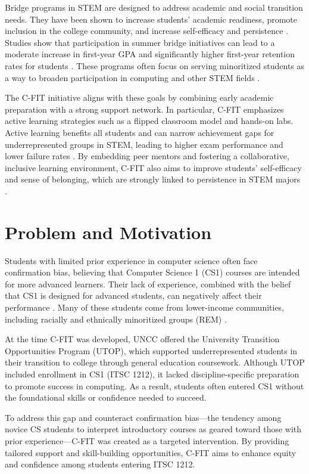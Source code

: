 \documentclass{article}
\begin{document}
Bridge programs in STEM are designed to address academic and social transition needs. They have been shown to increase students’ academic readiness, promote inclusion in the college community, and increase self-efficacy and persistence \cite{bradford2021,barth2021}. Studies show that participation in summer bridge initiatives can lead to a moderate increase in first-year GPA and significantly higher first-year retention rates for students \cite{bradford2021}. These programs often focus on serving minoritized students as a way to broaden participation in computing and other STEM fields \cite{washington2020}.

The C-FIT initiative aligns with these goals by combining early academic preparation with a strong support network. In particular, C-FIT emphasizes active learning strategies such as a flipped classroom model and hands-on labs. Active learning benefits all students and can narrow achievement gaps for underrepresented groups in STEM, leading to higher exam performance and lower failure rates \cite{theobald2020}. By embedding peer mentors and fostering a collaborative, inclusive learning environment, C-FIT also aims to improve students’ self-efficacy and sense of belonging, which are strongly linked to persistence in STEM majors \cite{barth2021,estrada2018}.

\section{Problem and Motivation}

Students with limited prior experience in computer science often face confirmation bias, believing that Computer Science 1 (CS1) courses are intended for more advanced learners. Their lack of experience, combined with the belief that CS1 is designed for advanced students, can negatively affect their performance \cite{tew2010}. Many of these students come from lower-income communities, including racially and ethnically minoritized groups (REM) \cite{washington2020}. 

At the time C-FIT was developed, UNCC offered the University Transition Opportunities Program (UTOP), which supported underrepresented students in their transition to college through general education coursework. Although UTOP included enrollment in CS1 (ITSC 1212), it lacked discipline-specific preparation to promote success in computing. As a result, students often entered CS1 without the foundational skills or confidence needed to succeed. 

To address this gap and counteract confirmation bias—the tendency among novice CS students to interpret introductory courses as geared toward those with prior experience—C-FIT was created as a targeted intervention. By providing tailored support and skill-building opportunities, C-FIT aims to enhance equity and confidence among students entering ITSC 1212.
\end{document}
